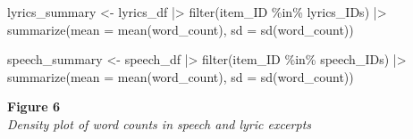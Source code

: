 \documentclass[
  man]{apa7}
\newenvironment{Shaded}{\begin{snugshade}}{\end{snugshade}}
\newcommand{\AttributeTok}[1]{\textcolor[rgb]{0.40,0.45,0.13}{#1}}
\newcommand{\FunctionTok}[1]{\textcolor[rgb]{0.28,0.35,0.67}{#1}}
\newcommand{\NormalTok}[1]{\textcolor[rgb]{0.00,0.23,0.31}{#1}}
\newcommand{\OtherTok}[1]{\textcolor[rgb]{0.00,0.23,0.31}{#1}}
\newcommand{\SpecialCharTok}[1]{\textcolor[rgb]{0.37,0.37,0.37}{#1}}
\begin{document}
\begin{Shaded}
\begin{Highlighting}[]
\NormalTok{lyrics\_summary }\OtherTok{\textless{}{-}}\NormalTok{ lyrics\_df }\SpecialCharTok{|\textgreater{}} \FunctionTok{filter}\NormalTok{(item\_ID }\SpecialCharTok{\%in\%}\NormalTok{ lyrics\_IDs) }\SpecialCharTok{|\textgreater{}} 
  \FunctionTok{summarize}\NormalTok{(}\AttributeTok{mean =} \FunctionTok{mean}\NormalTok{(word\_count), }\AttributeTok{sd =} \FunctionTok{sd}\NormalTok{(word\_count))}

\NormalTok{speech\_summary }\OtherTok{\textless{}{-}}\NormalTok{ speech\_df }\SpecialCharTok{|\textgreater{}} \FunctionTok{filter}\NormalTok{(item\_ID }\SpecialCharTok{\%in\%}\NormalTok{ speech\_IDs) }\SpecialCharTok{|\textgreater{}} 
  \FunctionTok{summarize}\NormalTok{(}\AttributeTok{mean =} \FunctionTok{mean}\NormalTok{(word\_count), }\AttributeTok{sd =} \FunctionTok{sd}\NormalTok{(word\_count))}
\end{Highlighting}
\end{Shaded}

{\textbf{Figure 6}\\
\emph{Density plot of word counts in speech and lyric excerpts}}
\end{document}
